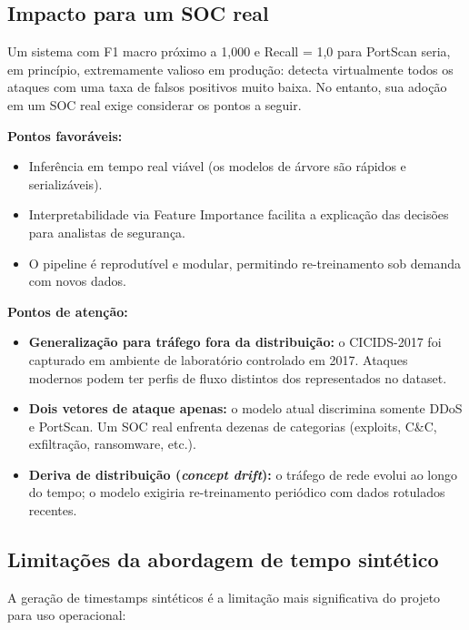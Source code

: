 \documentclass[12pt,a4paper]{article}
\begin{document}
\subsection{Impacto para um SOC real}

Um sistema com F1 macro próximo a 1{,}000 e Recall = 1{,}0 para PortScan
seria, em princípio, extremamente valioso em produção: detecta virtualmente
todos os ataques com uma taxa de falsos positivos muito baixa. No entanto,
sua adoção em um SOC real exige considerar os pontos a seguir.

\textbf{Pontos favoráveis:}
\begin{itemize}
  \item Inferência em tempo real viável (os modelos de árvore são rápidos e
        serializáveis).
  \item Interpretabilidade via Feature Importance facilita a explicação das
        decisões para analistas de segurança.
  \item O pipeline é reprodutível e modular, permitindo re-treinamento sob
        demanda com novos dados.
\end{itemize}

\textbf{Pontos de atenção:}
\begin{itemize}
  \item \textbf{Generalização para tráfego fora da distribuição:} o CICIDS-2017
        foi capturado em ambiente de laboratório controlado em 2017. Ataques
        modernos podem ter perfis de fluxo distintos dos representados no
        dataset.
  \item \textbf{Dois vetores de ataque apenas:} o modelo atual discrimina
        somente DDoS e PortScan. Um SOC real enfrenta dezenas de categorias
        (exploits, C\&C, exfiltração, ransomware, etc.).
  \item \textbf{Deriva de distribuição (\emph{concept drift}):} o tráfego de
        rede evolui ao longo do tempo; o modelo exigiria re-treinamento periódico
        com dados rotulados recentes.
\end{itemize}

\subsection{Limitações da abordagem de tempo sintético}

A geração de timestamps sintéticos é a limitação mais significativa do projeto
para uso operacional:
\end{document}
